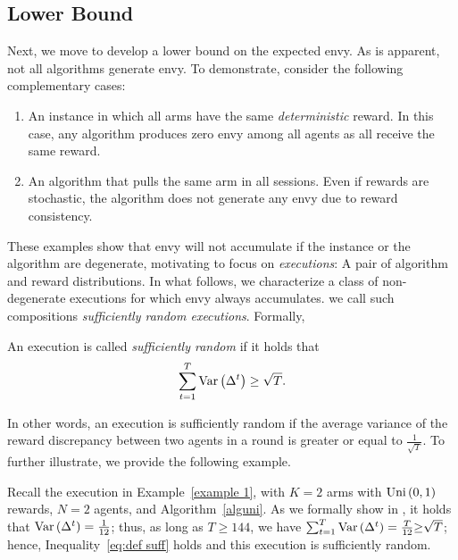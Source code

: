 \subsection{Lower Bound}\label{subsec:uni lower}
\label{sec: lb}

Next, we move to develop a lower bound on the expected envy. As is apparent, not all algorithms generate envy. To demonstrate, consider the following complementary cases:
\begin{enumerate}
    \item An instance in which all arms have the same \emph{deterministic} reward. In this case, any algorithm produces zero envy among all agents as all receive the same reward.
    \item An algorithm that pulls the same arm in all sessions. Even if rewards are stochastic, the algorithm does not generate any envy due to reward consistency.
\end{enumerate}
These examples show that envy will not accumulate if the instance or the algorithm are degenerate, motivating to focus on \emph{executions}: A pair of algorithm and reward distributions. In what follows, we characterize a class of non-degenerate executions for which envy always accumulates. we call such compositions \emph{sufficiently random executions}.
Formally,
\begin{definition}\label{def: sufficiently random}
    An execution is called \emph{sufficiently random} if it holds that
\begin{equation}\label{eq:def suff}
\sum_{t=1}^T{\mathrm{Var}\left( {\Delta^t} \right)} \geq \sqrt{T}.   
\end{equation}
\end{definition}
In other words, an execution is sufficiently random if the average variance of the reward discrepancy between two agents in a round is greater or equal to $\frac{1}{\sqrt{T}}$. To further illustrate, we provide the following example. 
\begin{example}\label{example: uni suff}
Recall the execution in Example~\ref{example 1}, with $K=2$ arms with  $\text{Uni}\left(0,1\right)$ rewards, $N=2$ agents, and Algorithm~\ref{alguni}. As we formally show in \ifnum{}\fi, it holds that $\mathrm{Var}\left( {\Delta^t} \right) = \frac{1}{12}$; thus, as long as $T \geq 144$, we have $\sum_{t=1}^T{\mathrm{Var}\left( {\Delta^t} \right)} = \frac{T}{12}  {\geq } \sqrt{T}
$; hence, Inequality~\eqref{eq:def suff} holds and this execution is sufficiently random. 
\end{example}
